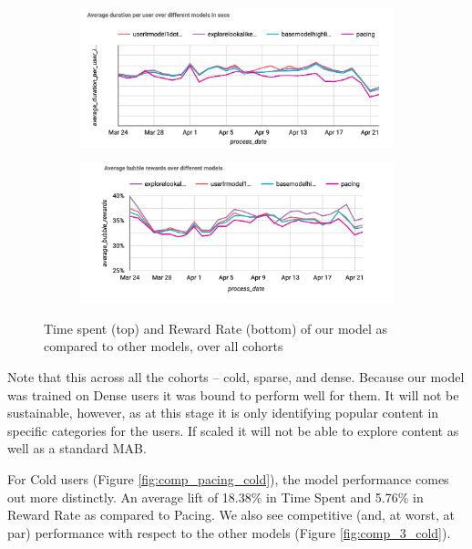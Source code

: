 \begin{figure}
    \centering
    \begin{subfigure}
      \centering
      \includegraphics[width=\linewidth]{figures/DurationOverall-wrt3.png}
    \end{subfigure}%
    \begin{subfigure}
      \centering
      \includegraphics[width=\linewidth]{figures/BubRewardOverall-wrt3.png}
    \end{subfigure}
    \caption{Time spent (top) and Reward Rate (bottom) of our model as compared to other models, over all cohorts}
    \label{fig:comp_3_overall}
\end{figure}

Note that this across all the cohorts – cold, sparse, and dense. Because our model was trained on Dense users it was bound to perform well for them. It will not be sustainable, however, as at this stage it is only identifying popular content in specific categories for the users. If scaled it will not be able to explore content as well as a standard MAB. 

For Cold users (Figure \ref{fig:comp_pacing_cold}), the model performance comes out more distinctly. An average lift of 18.38\% in Time Spent and 5.76\% in Reward Rate as compared to Pacing. We also see competitive (and, at worst, at par) performance with respect to the other models (Figure \ref{fig:comp_3_cold}). 

